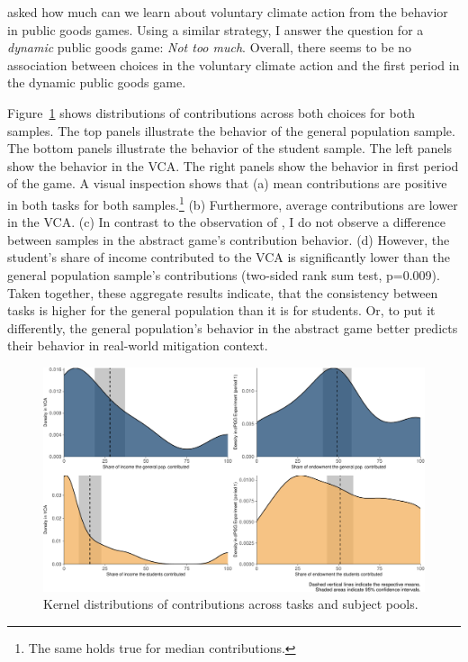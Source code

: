 \documentclass[
  authoryear,
  review,
  3p,
  onecolumn]{elsarticle}
\begin{document}
\citet{GKLS2020} asked how much can we learn about voluntary climate
action from the behavior in public goods games. Using a similar
strategy, I answer the question for a \emph{dynamic} public goods game:
\emph{Not too much}. Overall, there seems to be no association between
choices in the voluntary climate action and the first period in the
dynamic public goods game.

Figure~\ref{fig-kernel-generalizability} shows distributions of
contributions across both choices for both samples. The top panels
illustrate the behavior of the general population sample. The bottom
panels illustrate the behavior of the student sample. The left panels
show the behavior in the VCA. The right panels show the behavior in
first period of the game. A visual inspection shows that (a) mean
contributions are positive in both tasks for both samples.\footnote{The
  same holds true for median contributions.} (b) Furthermore, average
contributions are lower in the VCA. (c) In contrast to the observation
of \citet{GKLS2020}, I do not observe a difference between samples in
the abstract game's contribution behavior. (d) However, the student's
share of income contributed to the VCA is significantly lower than the
general population sample's contributions (two-sided rank sum test,
p=0.009). Taken together, these aggregate results indicate, that the
consistency between tasks is higher for the general population than it
is for students. Or, to put it differently, the general population's
behavior in the abstract game better predicts their behavior in
real-world mitigation context.

\begin{figure}

{\centering \includegraphics{paper_files/figure-pdf/fig-kernel-generalizability-1.pdf}

}

\caption{\label{fig-kernel-generalizability}Kernel distributions of
contributions across tasks and subject pools.}

\end{figure}
\end{document}
